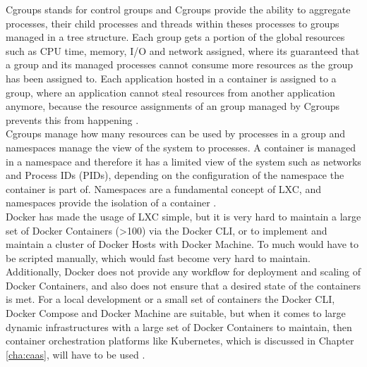 Cgroups stands for control groups and Cgroups provide the ability to aggregate processes, their child processes and threads within theses processes to groups managed in a tree structure. Each group gets a portion of the global resources such as CPU time, memory, I/O and network assigned, where its guaranteed that a group and its managed processes cannot consume more resources as the group has been assigned to. Each application hosted in a container is assigned to a group, where an application cannot steal resources from another application anymore, because the resource assignments of an group managed by Cgroups prevents this from happening \cite{KernelCGroupsV12018, KernelCGroupV22015, IntelLXCHyperVisor2014}. \\

Cgroups manage how many resources can be used by processes in a group and namespaces manage the view of the system to processes. A container is managed in a namespace and therefore it has a limited view of the system such as networks and Process IDs (PIDs), depending on the configuration of the namespace the container is part of. Namespaces are a fundamental concept of LXC, and namespaces provide the isolation of a container \cite{LinuxNamespaces2018, IntelLXCHyperVisor2014}. \\

Docker has made the usage of LXC simple, but it is very hard to maintain a large set of Docker Containers (>100) via the Docker CLI, or to implement and maintain a cluster of Docker Hosts with Docker Machine. To much would have to be scripted manually, which would fast become very hard to maintain. Additionally, Docker does not provide any workflow for deployment and scaling of Docker Containers, and also does not ensure that a desired state of the containers is met. For a local development or a small set of containers the Docker CLI, Docker Compose and Docker Machine are suitable, but when it comes to large dynamic infrastructures with a large set of Docker Containers to maintain, then container orchestration platforms like Kubernetes, which is discussed in Chapter \vref{cha:caas}, will have to be used \cite{DockerSwarm2018, CNCFKubernetes2018}. 
 

